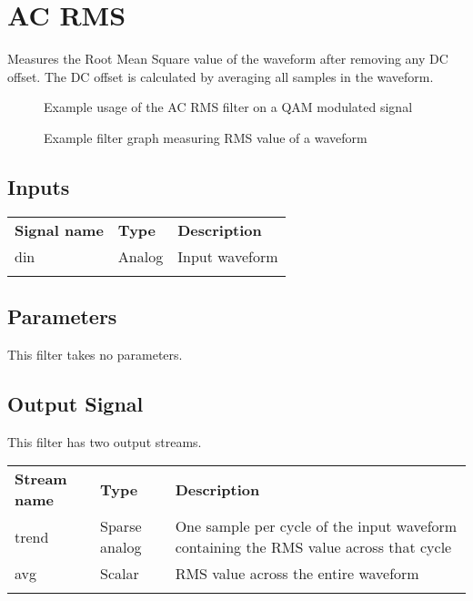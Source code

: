 \section{AC RMS}
\label{filter:acrms}

Measures the Root Mean Square value of the waveform after removing any DC offset. The DC offset is calculated by
averaging all samples in the waveform.

\begin{figure}[h]
\centering
{}
\caption{Example usage of the AC RMS filter on a QAM modulated signal}
\label{filter_acrms}
\end{figure}

\begin{figure}[h]
\centering
{}
\caption{Example filter graph measuring RMS value of a waveform}
\label{filter_graph_acrms}
\end{figure}
\FloatBarrier

\subsection{Inputs}

\begin{tabularx}{16cm}{llX}
\thickhline
\textbf{Signal name} & \textbf{Type} & \textbf{Description} \\
\thickhline
din & Analog & Input waveform \\
\thickhline
\end{tabularx}

\subsection{Parameters}

This filter takes no parameters.

\subsection{Output Signal}

This filter has two output streams.

\begin{tabularx}{16cm}{llX}
\thickhline
\textbf{Stream name} & \textbf{Type} & \textbf{Description} \\
\thickhline
trend & Sparse analog & One sample per cycle of the input waveform containing the RMS value across that cycle \\
\thinhline
avg & Scalar & RMS value across the entire waveform \\
\thickhline
\end{tabularx}

